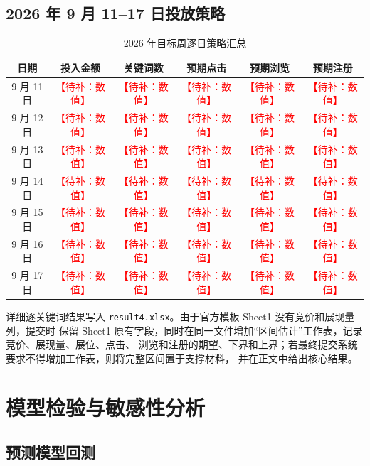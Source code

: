 \documentclass[UTF8,a4paper,zihao=-4]{ctexart}
\newcommand{\placeholder}[1]{\textcolor{red}{【待补：#1】}}
\begin{document}
\subsection{2026 年 9 月 11--17 日投放策略}

\begin{table}[H]
  \centering
  \caption{2026 年目标周逐日策略汇总}
  \label{tab:q4-daily}
  \begin{tabular}{cccccc}
    \toprule
    日期 & 投入金额 & 关键词数 & 预期点击 & 预期浏览 & 预期注册 \\
    \midrule
    9 月 11 日 & \placeholder{数值} & \placeholder{数值} & \placeholder{数值} & \placeholder{数值} & \placeholder{数值} \\
    9 月 12 日 & \placeholder{数值} & \placeholder{数值} & \placeholder{数值} & \placeholder{数值} & \placeholder{数值} \\
    9 月 13 日 & \placeholder{数值} & \placeholder{数值} & \placeholder{数值} & \placeholder{数值} & \placeholder{数值} \\
    9 月 14 日 & \placeholder{数值} & \placeholder{数值} & \placeholder{数值} & \placeholder{数值} & \placeholder{数值} \\
    9 月 15 日 & \placeholder{数值} & \placeholder{数值} & \placeholder{数值} & \placeholder{数值} & \placeholder{数值} \\
    9 月 16 日 & \placeholder{数值} & \placeholder{数值} & \placeholder{数值} & \placeholder{数值} & \placeholder{数值} \\
    9 月 17 日 & \placeholder{数值} & \placeholder{数值} & \placeholder{数值} & \placeholder{数值} & \placeholder{数值} \\
    \bottomrule
  \end{tabular}
\end{table}

详细逐关键词结果写入 \texttt{result4.xlsx}。由于官方模板 Sheet1 没有竞价和展现量列，提交时
保留 Sheet1 原有字段，同时在同一文件增加“区间估计”工作表，记录竞价、展现量、展位、点击、
浏览和注册的期望、下界和上界；若最终提交系统要求不得增加工作表，则将完整区间置于支撑材料，
并在正文中给出核心结果。

\section{模型检验与敏感性分析}

\subsection{预测模型回测}
\end{document}
